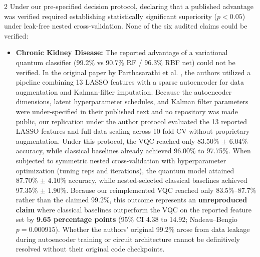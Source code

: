 \documentclass[10pt,a4paper,twoside]{article}
\begin{document}
\begin{multicols}{2}
Under our pre-specified decision protocol, declaring that a published advantage was verified required establishing statistically significant superiority ($p < 0.05$) under leak-free nested cross-validation. None of the six audited claims could be verified:
\begin{itemize}
  \setlength{\itemsep}{2pt}
  \setlength{\parskip}{0pt}
  \item \textbf{Chronic Kidney Disease:} The reported advantage of a variational quantum classifier (99.2\% vs 90.7\% RF / 96.3\% RBF net) could not be verified. In the original paper by Parthasarathi et al. \cite{parthasarathi2025}, the authors utilized a pipeline combining 13 LASSO features with a sparse autoencoder for data augmentation and Kalman-filter imputation. Because the autoencoder dimensions, latent hyperparameter schedules, and Kalman filter parameters were under-specified in their published text and no repository was made public, our replication under the author protocol evaluated the 13 reported LASSO features and full-data scaling across 10-fold CV without proprietary augmentation. Under this protocol, the VQC reached only 83.50\% $\pm$ 6.04\% accuracy, while classical baselines already achieved 96.00\% to 97.75\%. When subjected to symmetric nested cross-validation with hyperparameter optimization (tuning reps and iterations), the quantum model attained 87.70\% $\pm$ 4.10\% accuracy, while nested-selected classical baselines achieved 97.35\% $\pm$ 1.90\%. Because our reimplemented VQC reached only 83.5\%--87.7\% rather than the claimed 99.2\%, this outcome represents an \textbf{unreproduced claim} where classical baselines outperform the VQC on the reported feature set by \textbf{9.65 percentage points} (95\% CI 4.38 to 14.92; Nadeau--Bengio $p = 0.000915$). Whether the authors' original 99.2\% arose from data leakage during autoencoder training or circuit architecture cannot be definitively resolved without their original code checkpoints.

\end{itemize}
\end{multicols}
\end{document}
